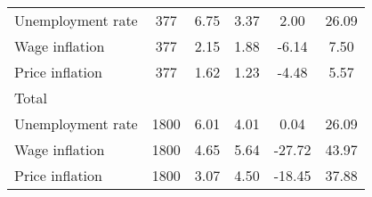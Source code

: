 \begin{table}[htbp]
\begin{tabular}{l*{1}{ccccc}}
Unemployment rate   &         377&        6.75&        3.37&        2.00&       26.09\\
Wage inflation      &         377&        2.15&        1.88&       -6.14&        7.50\\
Price inflation     &         377&        1.62&        1.23&       -4.48&        5.57\\
\hline
Total               &            &            &            &            &            \\
Unemployment rate   &        1800&        6.01&        4.01&        0.04&       26.09\\
Wage inflation      &        1800&        4.65&        5.64&      -27.72&       43.97\\
Price inflation     &        1800&        3.07&        4.50&      -18.45&       37.88\\
\hline\hline
\end{tabular}
\end{table}
